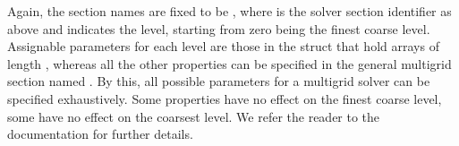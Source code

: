 Again, the section names are fixed to be , where  is the solver section identifier as above and  indicates the level, starting from zero being the finest coarse level.
Assignable parameters for each level are those in the  struct that hold arrays of length , whereas all the other properties can be specified in the general multigrid section named .
By this, all possible parameters for a multigrid solver can be specified exhaustively.
Some properties have no effect on the finest coarse level, some have no effect on the coarsest level.
We refer the reader to the \quda documentation for further details.

